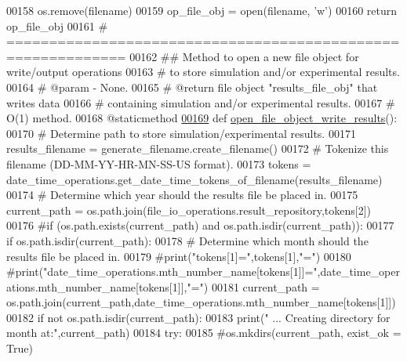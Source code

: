 \begin{DoxyCode}
00158             os.remove(filename)
00159         op\_file\_obj = open(filename, \textcolor{stringliteral}{'w'})
00160         \textcolor{keywordflow}{return} op\_file\_obj
00161     \textcolor{comment}{# ============================================================}
00162     \textcolor{comment}{##  Method to open a new file object for write/output operations}
00163     \textcolor{comment}{#       to store simulation and/or experimental results.}
00164     \textcolor{comment}{#   @param - None.}
00165     \textcolor{comment}{#   @return file object "results\_file\_obj" that writes data}
00166     \textcolor{comment}{#       containing simulation and/or experimental results.}
00167     \textcolor{comment}{#   O(1) method.}
00168     @staticmethod
\hypertarget{file__io_8py_source_l00169}{}\hyperlink{classutilities_1_1file__io_1_1file__io__operations_ad091638ea961413dba6775d065c0d589}{00169}     \textcolor{keyword}{def }\hyperlink{classutilities_1_1file__io_1_1file__io__operations_ad091638ea961413dba6775d065c0d589}{open\_file\_object\_write\_results}():
00170         \textcolor{comment}{# Determine path to store simulation/experimental results.}
00171         results\_filename = generate\_filename.create\_filename()
00172         \textcolor{comment}{# Tokenize this filename (DD-MM-YY-HR-MN-SS-US format).}
00173         tokens = date\_time\_operations.get\_date\_time\_tokens\_of\_filename(results\_filename)
00174         \textcolor{comment}{# Determine which year should the results file be placed in.}
00175         current\_path = os.path.join(file\_io\_operations.result\_repository,tokens[2])
00176         \textcolor{comment}{#if (os.path.exists(current\_path) and os.path.isdir(current\_path)):}
00177         \textcolor{keywordflow}{if} os.path.isdir(current\_path):
00178             \textcolor{comment}{# Determine which month should the results file be placed in.}
00179             \textcolor{comment}{#print("tokens[1]=",tokens[1],"=")}
00180             \textcolor{comment}{
      #print("date\_time\_operations.mth\_number\_name[tokens[1]]=",date\_time\_operations.mth\_number\_name[tokens[1]],"=")}
00181             current\_path = os.path.join(current\_path,date\_time\_operations.mth\_number\_name[tokens[1]])
00182             \textcolor{keywordflow}{if} \textcolor{keywordflow}{not} os.path.isdir(current\_path):
00183                 print(\textcolor{stringliteral}{" ... Creating directory for month at:"},current\_path)
00184                 \textcolor{keywordflow}{try}:
00185                     \textcolor{comment}{#os.mkdirs(current\_path, exist\_ok = True)}

\end{DoxyCode}
